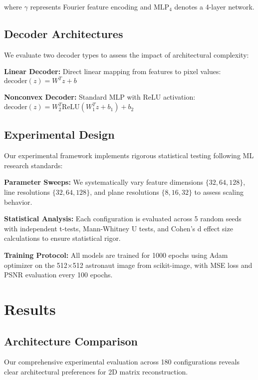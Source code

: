 \documentclass[10pt,twocolumn,letterpaper]{article}
\begin{document}
where $\gamma$ represents Fourier feature encoding and $\text{MLP}_4$ denotes a 4-layer network.

\subsection{Decoder Architectures}

We evaluate two decoder types to assess the impact of architectural complexity:

\textbf{Linear Decoder:} Direct linear mapping from features to pixel values:
$\text{decoder}(z) = W^T z + b$

\textbf{Nonconvex Decoder:} Standard MLP with ReLU activation:
$\text{decoder}(z) = W_2^T \text{ReLU}(W_1^T z + b_1) + b_2$

\subsection{Experimental Design}

Our experimental framework implements rigorous statistical testing following ML research standards:

\textbf{Parameter Sweeps:} We systematically vary feature dimensions $\{32, 64, 128\}$, line resolutions $\{32, 64, 128\}$, and plane resolutions $\{8, 16, 32\}$ to assess scaling behavior.

\textbf{Statistical Analysis:} Each configuration is evaluated across 5 random seeds with independent t-tests, Mann-Whitney U tests, and Cohen's d effect size calculations to ensure statistical rigor.

\textbf{Training Protocol:} All models are trained for 1000 epochs using Adam optimizer on the 512×512 astronaut image from scikit-image, with MSE loss and PSNR evaluation every 100 epochs.

\section{Results}

\subsection{Architecture Comparison}

Our comprehensive experimental evaluation across 180 configurations reveals clear architectural preferences for 2D matrix reconstruction.
\end{document}
